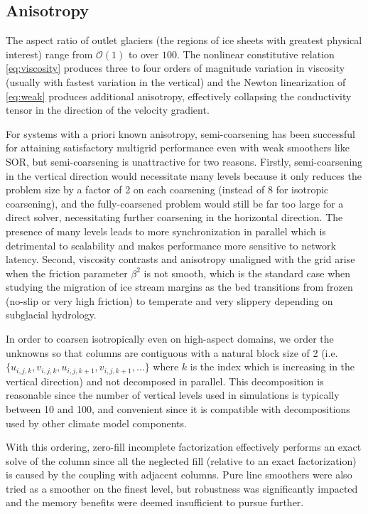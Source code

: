 \documentclass[3p]{elsarticle}
\newcommand{\bigO}{{\mathcal{O}}}
\begin{document}
\subsection{Anisotropy}
The aspect ratio of outlet glaciers (the regions of ice sheets with greatest physical interest) range from $\bigO(1)$ to over $100$.  The nonlinear constitutive relation \eqref{eq:viscosity} produces three to four orders of magnitude variation in viscosity (usually with fastest variation in the vertical) and the Newton linearization of \eqref{eq:weak} produces additional anisotropy, effectively collapsing the conductivity tensor in the direction of the velocity gradient.

For systems with a priori known anisotropy, semi-coarsening has been successful for attaining
satisfactory multigrid performance even with weak smoothers like SOR, but semi-coarsening is
unattractive for two reasons.  Firstly, semi-coarsening in the vertical direction would necessitate
many levels because it only reduces the problem size by a factor of 2 on each coarsening (instead of
8 for isotropic coarsening), and the fully-coarsened problem would still be far too large for a
direct solver, necessitating further coarsening in the horizontal direction.  The presence of many
levels leads to more synchronization in parallel which is detrimental to scalability and makes
performance more sensitive to network latency.  Second, viscosity contrasts and anisotropy
unaligned with the grid arise when the friction parameter $\beta^2$ is not smooth, which is the standard
case when studying the migration of ice stream margins as the bed transitions from frozen (no-slip
or very high friction) to temperate and very slippery depending on subglacial hydrology.

In order to coarsen isotropically even on high-aspect domains, we order the unknowns so that columns
are contiguous with a natural block size of 2
(i.e. $\{u_{i,j,k},v_{i,j,k},u_{i,j,k+1},v_{i,j,k+1},\dotsc\}$ where $k$ is the index which is
increasing in the vertical direction) and not decomposed in parallel.  This decomposition is
reasonable since the number of vertical levels used in simulations is typically between 10 and 100,
and convenient since it is compatible with decompositions used by other climate model components.

With this ordering, zero-fill incomplete factorization effectively performs an exact solve of the
column since all the neglected fill (relative to an exact factorization) is caused by the coupling
with adjacent columns.  Pure line smoothers were also tried as a smoother on the finest level, but
robustness was significantly impacted and the memory benefits were deemed insufficient to pursue
further.
\end{document}
